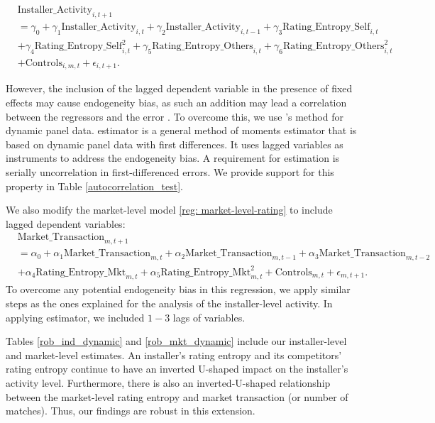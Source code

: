 \documentclass[msom,blindrev]{informs3}
\begin{document}
	\begin{align} \nonumber
	&\text{Installer\_Activity}_{i,t+1} \\ \nonumber
	&=\gamma_{0}+\gamma_{1} \text{Installer\_Activity}_{i,t}+ \gamma_{2}\text{Installer\_Activity}_{i,t-1}+
	\gamma_{3} \text{Rating\_Entropy\_Self}_{i,t} \\ \nonumber
	&+ \gamma_{4} \text{Rating\_Entropy\_Self}_{i,t}^ {2} + \gamma_{5} \text{Rating\_Entropy\_Others}_{i,t}  + \gamma_{6} \text{Rating\_Entropy\_Others}_{i,t}^{2} \\ \label{eq: extended_ind}
	&+ \text{Controls}_{i,m,t}+ \epsilon_{i,t+1}.
	\end{align}
	
	However,  the inclusion of the lagged dependent variable in the presence of fixed effects may cause endogeneity bias, as such an addition may lead a correlation between the regressors and the error \citep{nickell1981biases}. To overcome this, we use \cite{arellano1991some}'s method for dynamic panel data. \cite{arellano1991some} estimator is a general method of moments estimator that is based on dynamic panel data with first differences. It uses lagged variables as instruments to address the endogeneity bias. A requirement for \cite{arellano1991some} estimation is serially uncorrelation in first-differenced errors. We provide support for this property in Table \ref{autocorrelation_test}.
	
	
	
	We also modify the market-level model \eqref{reg: market-level-rating} to include lagged dependent variables:
	\begin{align} \nonumber
	&\text{Market\_Transaction}_{m,t+1}\\ \nonumber
	& =\alpha_{0}+ \alpha_{1} \text{Market\_Transaction}_{m,t}+ \alpha_{2} \text{Market\_Transaction}_{m,t-1} + \alpha_{3} \text{Market\_Transaction}_{m,t-2} \\ \label{eq: ext_market_level}
	&+ \alpha_{4} \text{Rating\_Entropy\_Mkt}_{m,t}+ \alpha_{5}\text{Rating\_Entropy\_Mkt}_{m,t} ^2 + \text{Controls}_{m,t}  +\epsilon_{m,t+1}.
	\end{align}
	To overcome any potential endogeneity bias in this regression, we apply similar steps as the ones explained for the analysis of the installer-level activity. In applying  \cite{arellano1991some} estimator, we included $1-3$ lags of variables.  
	
	Tables \ref{rob_ind_dynamic} and \ref{rob_mkt_dynamic} include our installer-level and market-level estimates. An installer's rating entropy and its competitors' rating entropy continue to have an inverted U-shaped impact on the installer's activity level. Furthermore, there is also an inverted-U-shaped relationship between the market-level rating entropy and market transaction (or number of matches).  Thus, our findings are robust in this extension.
	
\end{document}
